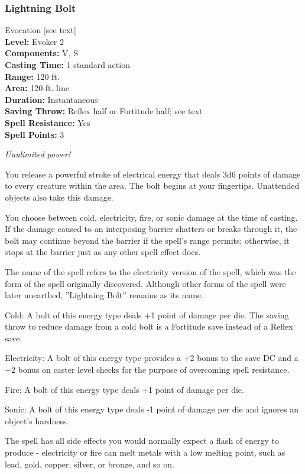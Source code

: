 \subsubsection{Lightning Bolt}
\label{Spell:LightningBolt}
Evocation [see text]
\\ \textbf{Level:} Evoker 2
\\ \textbf{Components:} V, S
\\ \textbf{Casting Time:} 1 standard action
\\ \textbf{Range:} 120 ft.
\\ \textbf{Area:} 120-ft. line
\\ \textbf{Duration:} Instantaneous
\\ \textbf{Saving Throw:} Reflex half or Fortitude half; see text
\\ \textbf{Spell Resistance:} Yes
\\ \textbf{Spell Points:} 3

\emph{Uuulimited power!}

You release a powerful stroke of electrical energy that deals 3d6 points of damage to every creature within the area. The bolt begins at your fingertips.
Unattended objects also take this damage. 

You choose between cold, electricity, fire, or sonic damage at the time of casting.
If the damage caused to an interposing barrier shatters or breaks through it, the bolt may continue beyond the barrier if the spell's range permits; otherwise, it stops at the barrier just as any other spell effect does.

The name of the spell refers to the electricity version of the spell, which was the form of the spell originally discovered.
Although other forms of the spell were later unearthed, ''Lightning Bolt'' remains as its name.
\begin{list}{}{\leftmargin=1em}
 \item Cold: A bolt of this energy type deals +1 point of damage per die. 
 The saving throw to reduce damage from a cold bolt is a Fortitude save instead of a Reflex save.
 \item Electricity: A bolt of this energy type provides a +2 bonus to the save DC
 and a +2 bonus on caster level checks for the purpose of overcoming spell resistance.
 \item Fire: A bolt of this energy type deals +1 point of damage per die.
 \item Sonic: A bolt of this energy type deals -1 point of damage per die and ignores an object's hardness.
\end{list}
The spell has all side effects you would normally expect a flash of energy to produce - electricity or fire can melt metals with a low melting point, such as lead, gold, copper, silver, or bronze, and so on.


